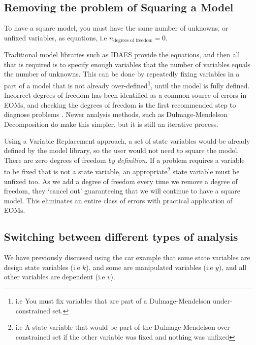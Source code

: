 \hypertarget{removing-the-problem-of-squaring-a-model}{%
\subsection{Removing the problem of Squaring a
Model}\label{removing-the-problem-of-squaring-a-model}}

To have a square model, you must have the same number of unknowns, or
unfixed variables, as equations, i.e
\(n_{\text{degrees\ of\ freedom}} = 0\).

Traditional model libraries such as IDAES provide the equations, and
then all that is required is to specify enough variables that the number
of variables equals the number of unknowns. This can be done by
repeatedly fixing variables in a part of a model that is not already
over-defined\footnote{i.e You must fix variables that are part of a
  Dulmage-Mendelson under-constrained set.}, until the model is fully
defined. Incorrect degrees of freedom has been identified as a common
source of errors in EOMs, and checking the degrees of freedom is the
first recommended step to diagnose problems \citep{lee2024model}. Newer
analysis methods, such as Dulmage-Mendelson Decomposition do make this
simpler, but it is still an iterative process.

Using a Variable Replacement approach, a set of state variables would be
already defined by the model library, so the user would not need to
square the model. There are zero degrees of freedom \emph{by
definition}. If a problem requires a variable to be fixed that is not a
state variable, an appropriate\footnote{i.e A state variable that would
  be part of the Dulmage-Mendelson over-constrained set if the other
  variable was fixed and nothing was unfixed} state variable must be
unfixed too. As we add a degree of freedom every time we remove a degree
of freedom, they `cancel out' guaranteeing that we will continue to have
a square model. This eliminates an entire class of errors with practical
application of EOMs.

\hypertarget{switching-between-different-types-of-analysis}{%
\subsection{Switching between different types of
analysis}\label{switching-between-different-types-of-analysis}}

We have previously discussed using the car example that some state
variables are design state variables (i.e \(k\)), and some are
manipulated variables (i.e \(y\)), and all other variables are dependent
(i.e \(v\)).

